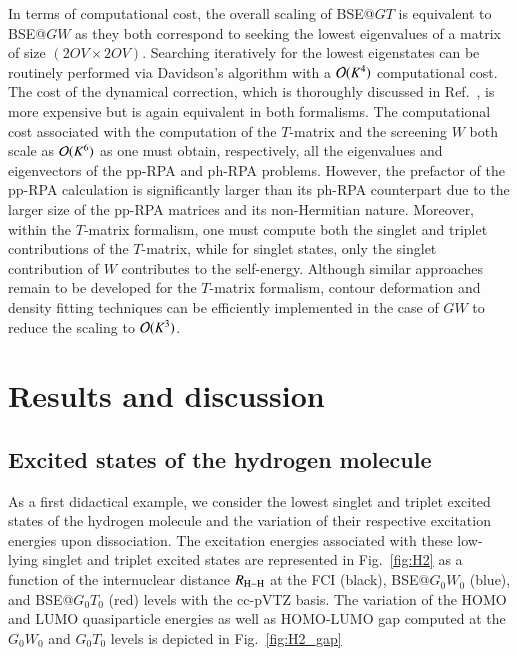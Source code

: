 \documentclass[aip,jcp,reprint,noshowkeys,superscriptaddress]{revtex4-1}
\begin{document}
In terms of computational cost, the overall scaling of BSE@$GT$ is equivalent to BSE@$GW$ as they both correspond to seeking the lowest eigenvalues of a matrix of size $(2OV \times 2OV)$. 
Searching iteratively for the lowest eigenstates can be routinely performed via Davidson's algorithm with a $\order*{K^4}$ computational cost. \cite{Davidson_1975}
The cost of the dynamical correction, which is thoroughly discussed in Ref.~, is more expensive but is again equivalent in both formalisms.
The computational cost associated with the computation of the $T$-matrix and the screening $W$ both scale as $\order*{K^6}$ as one must obtain, respectively, all the eigenvalues and eigenvectors of the pp-RPA and ph-RPA problems.
However, the prefactor of the pp-RPA calculation is significantly larger than its ph-RPA counterpart due to the larger size of the pp-RPA matrices and its non-Hermitian nature. \cite{Peng_2013,Scuseria_2013,Yang_2013,Yang_2013b,Yang_2014a,Zhang_2015,Zhang_2016}
Moreover, within the $T$-matrix formalism, one must compute both the singlet and triplet contributions of the $T$-matrix, while for singlet states, only the singlet contribution of $W$ contributes to the self-energy.
Although similar approaches remain to be developed for the $T$-matrix formalism, contour deformation and density fitting techniques can be efficiently implemented in the case of $GW$ to reduce the scaling to $\order*{K^3}$. \cite{Duchemin_2019,Duchemin_2020,Duchemin_2021}

\section{Results and discussion}
\label{sec:res}

\subsection{Excited states of the hydrogen molecule}
\label{sec:h2}
As a first didactical example, we consider the lowest singlet and triplet excited states of the hydrogen molecule  and the variation of their respective excitation energies upon dissociation.
The excitation energies associated with these low-lying singlet and triplet excited states are represented in Fig.~\ref{fig:H2} as a function of the internuclear distance $R_{\ce{H-H}}$ at the FCI (black), BSE@$G_0W_0$ (blue), and BSE@$G_0T_0$ (red) levels with the cc-pVTZ basis.
The variation of the HOMO and LUMO quasiparticle energies as well as HOMO-LUMO gap computed at the $G_0W_0$ and $G_0T_0$ levels is depicted in Fig.~\ref{fig:H2_gap}
\end{document}
